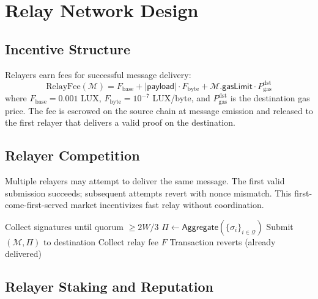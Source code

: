 \documentclass[11pt,a4paper]{article}
\begin{document}
\section{Relay Network Design}\label{sec:relay}

\subsection{Incentive Structure}

Relayers earn fees for successful message delivery:
\begin{equation}
    \text{RelayFee}(\mathcal{M}) = F_{\text{base}} + |\mathsf{payload}| \cdot F_{\text{byte}} + \mathcal{M}.\mathsf{gasLimit} \cdot P_{\text{gas}}^{\text{dst}}
\end{equation}
where $F_{\text{base}} = 0.001$ LUX, $F_{\text{byte}} = 10^{-7}$ LUX/byte, and $P_{\text{gas}}^{\text{dst}}$ is the destination gas price. The fee is escrowed on the source chain at message emission and released to the first relayer that delivers a valid proof on the destination.

\subsection{Relayer Competition}

Multiple relayers may attempt to deliver the same message. The first valid submission succeeds; subsequent attempts revert with nonce mismatch. This first-come-first-served market incentivizes fast relay without coordination.

\begin{algorithm}[H]
\caption{Relayer Selection via Competition}
\label{alg:relayer}
\begin{algorithmic}[1]
    \State Collect signatures until quorum $\geq 2W/3$
    \State $\Pi \gets \mathsf{Aggregate}(\{\sigma_i\}_{i \in \mathcal{Q}})$
    \State Submit $(\mathcal{M}, \Pi)$ to destination
        \State Collect relay fee $F$
    \Else
        \State Transaction reverts (already delivered)
    \EndIf
\EndFor
\end{algorithmic}
\end{algorithm}

\subsection{Relayer Staking and Reputation}
\end{document}
